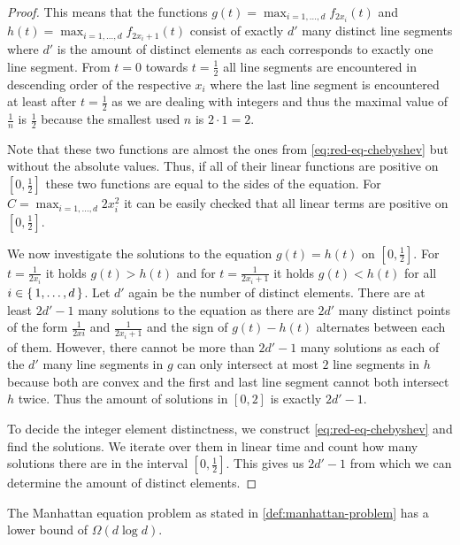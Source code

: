 \begin{proof}
	This means that the functions \(g(t) = \max_{i=1,\dots, d} f_{2x_i}(t)\) and \(h(t) = \max_{i=1,\dots, d} f_{2x_i+1}(t)\) consist of exactly \(d'\) many distinct line segments where \(d'\) is the amount of distinct elements as each corresponds to exactly one line segment. From \(t=0\) towards \(t = \frac{1}{2}\) all line segments are encountered in descending order of the respective \(x_i\) where the last line segment is encountered at least after \(t=\frac{1}{2}\) as we are dealing with integers and thus the maximal value of \(\frac{1}{n}\) is \(\frac{1}{2}\) because the smallest used \(n\) is \(2 \cdot 1 = 2\). 

	Note that these two functions are almost the ones from \cref{eq:red-eq-chebyshev} but without the absolute values. Thus, if all of their linear functions are positive on \([0,\frac{1}{2}]\) these two functions are equal to the sides of the equation. For \(C = \max_{i=1, \dots, d}2x_i^2\) it can be easily checked that all linear terms are positive on \([0, \frac{1}{2}]\).

	We now investigate the solutions to the equation \(g(t) = h(t)\) on \([0, \frac{1}{2}]\). For \(t = \frac{1}{2x_i}\) it holds \(g(t) > h(t)\) and for \(t = \frac{1}{2x_i + 1}\) it holds \(g(t) < h(t)\) for all \(i \in \set{1,\dots, d}\). Let \(d'\) again be the number of distinct elements. There are at least \(2d' - 1\) many solutions to the equation as there are \(2d'\) many distinct points of the form \(\frac{1}{2xi}\) and \(\frac{1}{2x_i+1}\) and the sign of \(g(t)-h(t)\) alternates between each of them. However, there cannot be more than \(2d'-1\) many solutions as each of the \(d'\) many line segments in \(g\) can only intersect at most \(2\) line segments in \(h\) because both are convex and the first and last line segment cannot both intersect \(h\) twice. Thus the amount of solutions in \([0,2]\) is exactly \(2d'-1\). 

	To decide the integer element distinctness, we construct \cref{eq:red-eq-chebyshev} and find the solutions. We iterate over them in linear time and count how many solutions there are in the interval \([0, \frac{1}{2}]\). This gives us \(2d'-1\) from which we can determine the amount of distinct elements.
\end{proof}

\begin{lemma}
	The Manhattan equation problem as stated in \cref{def:manhattan-problem} has a lower bound of \(\Omega(d \log d)\).
\end{lemma}

